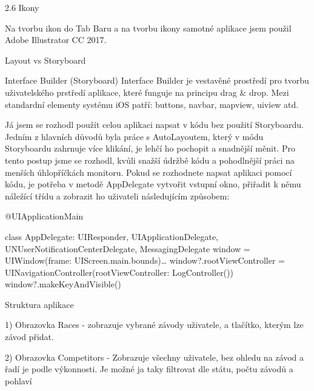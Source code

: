 \documentclass{article}
\begin{document}
\vspace{10 mm}

2.6 Ikony

Na tvorbu ikon do Tab Baru a na tvorbu ikony samotné aplikace jsem použil Adobe Illustrator CC 2017. 
\vspace{10 mm}
        
Layout vs Storyboard

Interface Builder (Storyboard)
Interface Builder je vestavěné prostředí pro tvorbu uživatelského prstředí aplikace, které funguje na principu drag & drop. Mezi standardní elementy systému iOS patří: buttons, navbar, mapview, uiview atd.
\vspace{10 mm}

Já jsem se rozhodl použít celou aplikaci napsat v kódu bez použití Storyboardu. 
Jedním z hlavních důvodů byla práce s AutoLayoutem, který v módu Storyboardu zahrnuje více klikání, je lehčí ho pochopit a snadnější měnit. 
Pro tento postup jsme se rozhodl, kvůli snažší údržbě kódu a pohodlnější práci na menších úhlopříčkách monitoru. Pokud se rozhodnete napsat aplikaci pomocí kódu, je potřeba v metodě AppDelegate vytvořit vstupní okno, přiřadit k němu náležící třídu a zobrazit ho uživateli následujícím způsobem:
\vspace{10 mm}

@UIApplicationMain

class AppDelegate: UIResponder, UIApplicationDelegate, UNUserNotificationCenterDelegate, MessagingDelegate {
  window = UIWindow(frame: UIScreen.main.bounds)…
  window?.rootViewController = UINavigationController(rootViewController: LogController())
    window?.makeKeyAndVisible()
}
    
\vspace{10 mm}




\vspace{10 mm}
Struktura aplikace

1) Obrazovka Races - zobrazuje vybrané závody uživatele, a tlačítko, kterým lze závod přidat.

\vspace{10 mm}


















2) Obrazovka Competitors - Zobrazuje všechny uživatele, bez ohledu na závod a řadí je podle výkonnosti. Je možné ja taky filtrovat dle státu, počtu závodů a pohlaví
\end{document}
